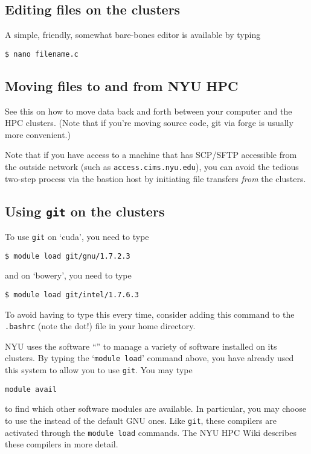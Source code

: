 \documentclass[11pt]{article}
\begin{document}
\subsection*{Editing files on the clusters}

A simple, friendly, somewhat bare-bones editor is available by typing
\begin{lstlisting}
$ nano filename.c
\end{lstlisting}%
\subsection*{Moving files to and from NYU HPC}

See this
 on how to move data back and forth between your computer and the
HPC clusters. (Note that if you're moving source code, git via forge is usually
more convenient.)

Note that if you have access to a machine that has SCP/SFTP accessible
from the outside network (such as \texttt{access.cims.nyu.edu}), you
can avoid the tedious two-step process via the bastion host by
initiating file transfers \emph{from} the clusters.

\subsection*{Using \texttt{git} on the clusters}

To use
\texttt{git} on `cuda', you need to type
\begin{lstlisting}
$ module load git/gnu/1.7.2.3
\end{lstlisting}%
and on `bowery', you need to type
\begin{lstlisting}
$ module load git/intel/1.7.6.3
\end{lstlisting}%
To avoid having to type this every time, consider adding this command
to the \texttt{.bashrc} (note the dot!) file in your home directory.

NYU uses the software ``'' to manage a variety of software installed on its clusters.
By typing the `\texttt{module load}' command above, you have already
used this system to allow you to use \texttt{git}. You may type
\begin{lstlisting}
module avail
\end{lstlisting}
to find which other software modules are available. In particular, you
may choose to use the
 instead of the default GNU ones. Like \texttt{git}, these
compilers are activated through the \texttt{module load} commands. The
NYU HPC Wiki describes these compilers in more detail.
\end{document}
